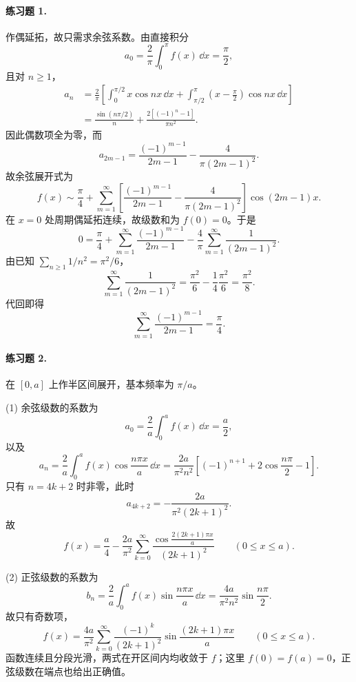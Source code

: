 \paragraph{练习题 1.}
\begin{xsolution}
作偶延拓，故只需求余弦系数。由直接积分
\[
  a_0=\frac2\pi\int_0^\pi f(x)\,\dd x=\frac\pi2,
\]
且对 $n\ge1$，
\begin{align*}
  a_n
  &=\frac2\pi\left[
    \int_0^{\pi/2}x\cos nx\,\dd x
    +\int_{\pi/2}^{\pi}\left(x-\frac\pi2\right)\cos nx\,\dd x
    \right]\\
  &=\frac{\sin(n\pi/2)}n
    +\frac{2[(-1)^n-1]}{\pi n^2}.
\end{align*}
因此偶数项全为零，而
\[
  a_{2m-1}
  =\frac{(-1)^{m-1}}{2m-1}
   -\frac4{\pi(2m-1)^2}.
\]
故余弦展开式为
\[
  f(x)\sim\frac\pi4+
  \sum_{m=1}^{\infty}
  \left[
    \frac{(-1)^{m-1}}{2m-1}
    -\frac4{\pi(2m-1)^2}
  \right]\cos(2m-1)x.
\]
在 $x=0$ 处周期偶延拓连续，故级数和为 $f(0)=0$。于是
\[
  0=\frac\pi4+\sum_{m=1}^{\infty}\frac{(-1)^{m-1}}{2m-1}
  -\frac4\pi\sum_{m=1}^{\infty}\frac1{(2m-1)^2}.
\]
由已知 $\sum_{n\ge1}1/n^2=\pi^2/6$，
\[
  \sum_{m=1}^{\infty}\frac1{(2m-1)^2}
  =\frac{\pi^2}{6}-\frac14\frac{\pi^2}{6}=\frac{\pi^2}{8}.
\]
代回即得
\[
  \boxed{\displaystyle
  \sum_{m=1}^{\infty}\frac{(-1)^{m-1}}{2m-1}=\frac\pi4 }.
\]
\end{xsolution}

\paragraph{练习题 2.}
\begin{xsolution}
在 $[0,a]$ 上作半区间展开，基本频率为 $\pi/a$。

(1) 余弦级数的系数为
\[
  a_0=\frac2a\int_0^af(x)\,\dd x=\frac a2,
\]
以及
\[
  a_n=\frac2a\int_0^af(x)\cos\frac{n\pi x}{a}\,\dd x
  =\frac{2a}{\pi^2n^2}
  \left[(-1)^{n+1}+2\cos\frac{n\pi}{2}-1\right].
\]
只有 $n=4k+2$ 时非零，此时
\[
  a_{4k+2}=-\frac{2a}{\pi^2(2k+1)^2}.
\]
故
\[
  \boxed{\displaystyle
  f(x)=\frac{a}{4}-
  \frac{2a}{\pi^2}
  \sum_{k=0}^{\infty}
  \frac{\cos\frac{2(2k+1)\pi x}{a}}{(2k+1)^2}}
  \qquad(0\le x\le a).
\]

(2) 正弦级数的系数为
\[
  b_n=\frac2a\int_0^af(x)\sin\frac{n\pi x}{a}\,\dd x
  =\frac{4a}{\pi^2n^2}\sin\frac{n\pi}{2}.
\]
故只有奇数项，
\[
  \boxed{\displaystyle
  f(x)=\frac{4a}{\pi^2}
  \sum_{k=0}^{\infty}
  \frac{(-1)^k}{(2k+1)^2}
  \sin\frac{(2k+1)\pi x}{a}}
  \qquad(0\le x\le a).
\]
函数连续且分段光滑，两式在开区间内均收敛于 $f$；这里 $f(0)=f(a)=0$，正弦级数在端点也给出正确值。
\end{xsolution}

